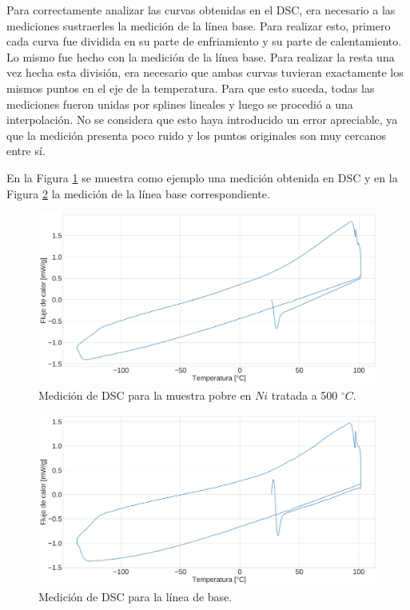 \documentclass[12pt]{article}
\theoremstyle{definition}
\theoremstyle{remark}
\begin{document}
Para correctamente analizar las curvas obtenidas en el DSC, era necesario a las mediciones sustraerles la medición de la línea base. Para realizar esto, primero cada curva fue dividida en su parte de enfriamiento y su parte de calentamiento. Lo mismo fue hecho con la medición de la línea base. Para realizar la resta una vez hecha esta división, era necesario que ambas curvas tuvieran exactamente los mismos puntos en el eje de la temperatura. Para que esto suceda, todas las mediciones fueron unidas por splines lineales
y luego se procedió a una interpolación. No se considera que esto haya introducido un error apreciable, ya que la medición presenta poco ruido y los puntos originales son muy cercanos entre sí.

En la Figura \ref{MeasureExample} se muestra como ejemplo una medición obtenida en DSC y en la Figura \ref{BaseLine} la medición de la línea base correspondiente.

\begin{figure}[H]
	\centering	
	\includegraphics[scale=0.3]{img/500NiPoorExample}
	\caption{Medición de DSC para la muestra pobre en $Ni$ tratada a 500 $^\circ C$.}
	\label{MeasureExample}
\end{figure}

\begin{figure}[H]
	\centering
	\includegraphics[scale=0.3]{img/BaseLine}
	\caption{Medición de DSC para la línea de base.}
	\label{BaseLine}
\end{figure}
\end{document}
